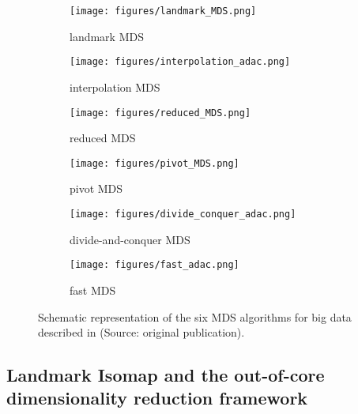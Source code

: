 \begin{figure}[ht]
    \centering
    \captionsetup[subfigure]{labelformat=empty}

    \begin{subfigure}[t]{0.3\textwidth}
        \centering
        \texttt{[image: figures/landmark\_MDS.png]}
        \caption{landmark MDS}
        \label{fig:landmark_MDS}
    \end{subfigure}
    \hfill
    \begin{subfigure}[t]{0.3\textwidth}
        \centering
        \texttt{[image: figures/interpolation\_adac.png]}
        \caption{interpolation MDS}
        \label{fig:interpolation_MDS}
    \end{subfigure}
    \hfill
    \begin{subfigure}[t]{0.3\textwidth}
        \centering
        \texttt{[image: figures/reduced\_MDS.png]}
        \caption{reduced MDS}
        \label{fig:reduced_MDS}
    \end{subfigure}

    \begin{subfigure}[t]{0.3\textwidth}
        \centering
        \texttt{[image: figures/pivot\_MDS.png]}
        \caption{pivot MDS}
        \label{fig:pivot_MDS}
    \end{subfigure}
    \hfill
    \begin{subfigure}[t]{0.3\textwidth}
        \centering
        \texttt{[image: figures/divide\_conquer\_adac.png]}
        \caption{divide-and-conquer MDS}
        \label{fig:divide_conquer_MDS}
    \end{subfigure}
    \hfill
    \begin{subfigure}[t]{0.3\textwidth}
        \centering
        \texttt{[image: figures/fast\_adac.png]}
        \caption{fast MDS}
        \label{fig:fast_MDS}
    \end{subfigure}
    
    \caption{Schematic representation of the six MDS algorithms for big data described in \cite{Delicado2024} (Source: original publication).}
    \label{fig:bigmds}
\end{figure}

\subsection{Landmark Isomap and the out-of-core dimensionality reduction framework}
\label{sec:landmark-Isomap-OOC-DR-framework}

